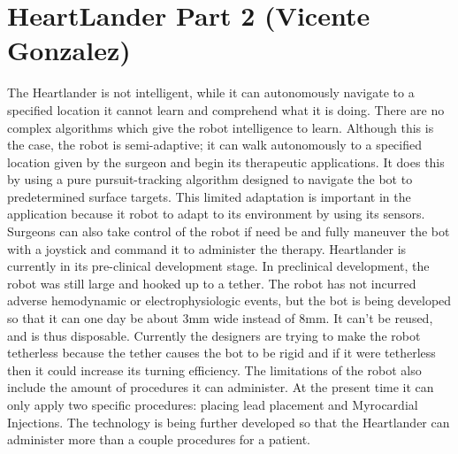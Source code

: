 \documentclass[12pt,conference]{IEEEtran}
\begin{document}
\section {HeartLander Part 2 (Vicente Gonzalez)}

\indent The Heartlander is not intelligent, while it can autonomously navigate to a specified location it cannot learn and comprehend what it is doing. There are no complex algorithms which give the robot intelligence to learn. Although this is the case, the robot is semi-adaptive; it can walk autonomously to a specified location given by the surgeon and begin its therapeutic applications. It does this by using a pure pursuit-tracking algorithm designed to navigate the bot to predetermined surface targets. This limited adaptation is important in the application because it robot to adapt to its environment by using its sensors. Surgeons can also take control of the robot if need be and fully maneuver the bot with a joystick and command it to administer the therapy. Heartlander is currently in its pre-clinical development stage.
\newline
\indent In preclinical development, the robot was still large and hooked up to a tether. The robot has not incurred adverse hemodynamic or electrophysiologic events, but the bot is being developed so that it can one day be about 3mm wide instead of 8mm. It can’t be reused, and is thus disposable. Currently the designers are trying to make the robot tetherless because the tether causes the bot to be rigid and if it were tetherless then it could increase its turning efficiency. The limitations of the robot also include the amount of procedures it can administer. At the present time it can only apply two specific procedures: placing lead placement and Myrocardial Injections. The technology is being further developed so that the Heartlander can administer more than a couple procedures for a patient. 
\end{document}

